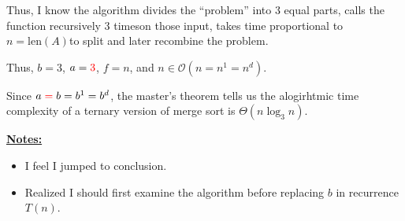 \documentclass[12pt]{article}
\begin{document}
\begin{itemize}
\begin{mdframed}
        \bigskip

        Thus, I know the algorithm divides the ``problem'' into 3 equal parts, calls
        the function recursively \color{red}3 times\color{black}\:on those input,
        takes time proportional to \color{red}$n = \text{len}(A)$\color{black}\:to
        split and later recombine the problem.

        \bigskip

        Thus, $b = 3$, $a = \color{red}3\color{black}$, $f = n$, and
        $n \in \mathcal{O}(n = n^1 = n^d)$.

        \bigskip

        Since $a \color{red}=\color{black} b = b^1 = b^d$, the master's
        theorem tells us the alogirhtmic time complexity of a ternary version of
        merge sort is \color{red}$\Theta(n\log_3 n)$\color{black}.

    \end{mdframed}
\end{itemize}

\bigskip

\underline{\textbf{Notes:}}

\bigskip

\begin{itemize}
    \item I feel I jumped to conclusion.
    \item Realized I should first examine the algorithm before replacing $b$
    in recurrence $T(n)$.
\end{itemize}
\end{document}
